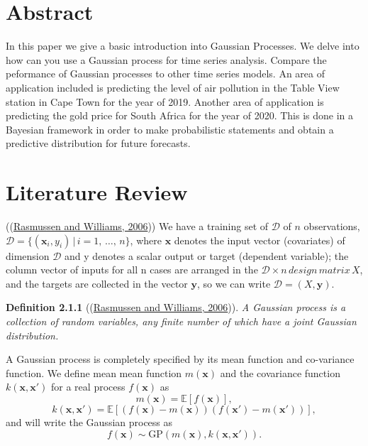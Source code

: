 \documentclass[a4paper, 10pt]{article}
\begin{document}
   \begin{flushleft}

   \section*{Abstract}

    In this paper we give a basic introduction into Gaussian Processes. We delve into how can you use a Gaussian process for time series analysis. Compare the peformance of Gaussian processes to other time series models. An area of application included is predicting the level of air pollution in the Table View station in Cape Town for the year of 2019. Another area of application is predicting the gold price for South Africa for the year of 2020. This is done in a Bayesian framework in order to make probabilistic statements and obtain a predictive distribution for future forecasts.

   \section*{Literature Review}

   ((\hyperref[Rasmussen2006]{Rasmussen and Williams, 2006})) We have a training set of $\mathcal{D}$ of $n$ observations, $\mathcal{D} = \{(\mathbf{x}_{i}, y_{i}) \, | \, i = 1, \, \ldots, \, n\}$, where $\mathbf{x}$ denotes the input vector (covariates) of dimension $\mathcal{D}$ and y denotes a scalar output or target (dependent variable); the column vector of inputs for all n cases are arranged in the $\mathcal{D} \times n \, design \, matrix\, X$, and the targets are collected in the vector $\mathbf{y}$, so we can write $\mathcal{D} = (X, \mathbf{y})$. 

   \vspace{1em}

   \textbf{Definition 2.1.1} ((\hyperref[Rasmussen2006]{Rasmussen and Williams, 2006})).
   \textit{A Gaussian process is a collection of random variables, any finite number of which have a joint Gaussian distribution.}

   \vspace{1em}

   A Gaussian process is completely specified by its mean function and co-variance function. We define mean mean function $m(\mathbf{x})$ and the covariance function $k(\mathbf{x}, \mathbf{x}')$ for a real process $f(\mathbf{x})$ as
   $$m(\mathbf{x}) = \mathbb{E}[f(\mathbf{x})],$$
   $$k(\mathbf{x}, \mathbf{x}') = \mathbb{E}[(f(\mathbf{x}) - m(\mathbf{x}))(f(\mathbf{x}') - m(\mathbf{x}'))],$$
   and will write the Gaussian process as
   $$f(\mathbf{x}) \sim \text{GP}(m(\mathbf{x}), k(\mathbf{x}, \mathbf{x}')).$$


\end{flushleft}
\end{document}
